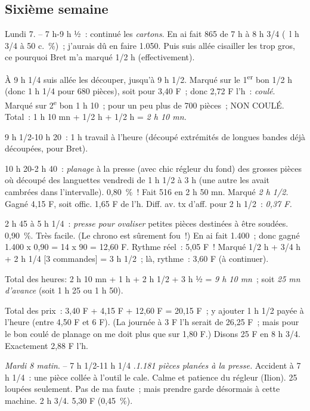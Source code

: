 \documentclass[french,twoside]{book} %
\begin{document}
\subsection[Sixième semaine]{Sixième semaine}
\noindent \par
\par
Lundi 7. – 7 h-9 h ½ : continué les {\itshape cartons}. En ai fait 865 de 7 h à 8 h 3/4 ( l h 3/4 à 50 c. \%) ; j'aurais dû en faire 1.050. Puis suis allée cisailler les trop gros, ce pourquoi Bret m'a marqué 1/2 h (effectivement).\par
À 9 h 1/4 suis allée les découper, jusqu'à 9 h 1/2. Marqué sur le 1\textsuperscript{er} bon 1/2 h (donc 1 h 1/4 pour 680 pièces), soit pour 3,40 F ; donc 2,72 F l'h : {\itshape coulé}. Marqué sur 2\textsuperscript{e} bon 1 h 10 ; pour un peu plus de 700 pièces ; NON COULÉ. Total : 1 h 10 mn + 1/2 h + 1/2 h = {\itshape 2 h 10 mn.}\par
9 h 1/2-10 h 20 : 1 h travail à l'heure (découpé extrémités de longues bandes déjà découpées, pour Bret).\par
10 h 20-2 h 40 : {\itshape planage} à la presse (avec chic régleur du fond) des grosses pièces où découpé des languettes vendredi de 1 h 1/2 à 3 h (une autre les avait cambrées dans l'intervalle). 0,80 \% ! Fait 516 en 2 h 50 mn. Marqué {\itshape 2 h 1/2.} Gagné 4,15 F, soit offic. 1,65 F de l'h. Diff. av. tx d'aff. pour 2 h 1/2 : {\itshape 0,37 F.}\par
2 h 45 à 5 h 1/4 : {\itshape presse pour ovaliser} petites pièces destinées à être soudées. 0,90 \%. Très facile. (Le chrono est sûrement fou !) En ai fait 1.400 ; donc gagné 1.400 x 0,90 = 14 x 90 = 12,60 F. Rythme réel : 5,05 F ! Marqué 1/2 h + 3/4 h + 2 h 1/4 [3 commandes] = 3 h 1/2 ; là, rythme : 3,60 F (à continuer).\par
Total des heures: 2 h 10 mn + 1 h + 2 h 1/2 + 3 h ½ = {\itshape 9 h 10 mn} ; soit {\itshape 25 mn d'avance} (soit 1 h 25 ou 1 h 50).\par
Total des prix : 3,40 F + 4,15 F + 12,60 F = 20,15 F ; y ajouter 1 h 1/2 payée à l'heure (entre 4,50 F et 6 F). (La journée à 3 F l'h serait de 26,25 F ; mais pour le bon coulé de planage on me doit plus que sur 1,80 F.) Disons 25 F en 8 h 3/4. Exactement 2,88 F l'h.\par
{\itshape Mardi 8 matin}. – 7 h 1/2-11 h 1/4 .{\itshape 1.181 pièces planées à la presse.} Accident à 7 h 1/4 : une pièce collée à l'outil le cale. Calme et patience du régleur (Ilion). 25 loupées seulement. Pas de ma faute ; mais prendre garde désormais à cette machine. 2 h 3/4. 5,30 F (0,45 \%).\par
\end{document}
